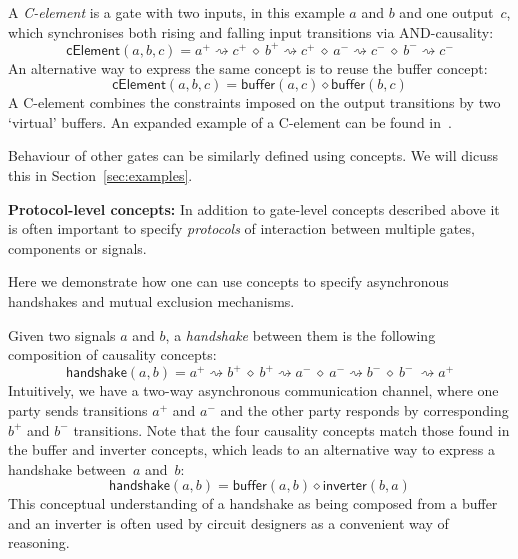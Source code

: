 \documentclass[british,conference,compsoc]{IEEEtran}
\begin{document}

\noindent A \emph{C-element} is a gate with two inputs, in this example $a$ and $b$ and one
output~$c$, which synchronises both rising and falling input transitions
via AND-causality:
\[
\mathsf{cElement}(a, b, c)=a^{+}\!\rightsquigarrow\! c^{+}\ \diamond\
b^{+}\!\rightsquigarrow\! c^{+}\ \diamond\ a^{-}\!\rightsquigarrow\! c^{-}\
\diamond\ b^{-}\!\rightsquigarrow\! c^{-}
\]
An alternative way to express the same concept is to reuse the buffer concept:
\[
\mathsf{cElement}(a, b, c)=\mathsf{buffer}(a, c) \diamond \mathsf{buffer}(b, c)
\]
A C-element combines the constraints imposed on the output
transitions by two `virtual' buffers. An expanded example of a C-element can be
found in~\cite{2015_Beaumont_MEMOCODE}.

Behaviour of other gates can be similarly defined using concepts. We will dicuss
this in Section~\ref{sec:examples}.

\textbf{Protocol-level concepts:} In addition to gate-level concepts
described above it is often important to specify \emph{protocols}
of interaction between multiple gates, components or signals. 

Here we demonstrate how one can use concepts to specify asynchronous handshakes
and mutual exclusion mechanisms.

Given two signals $a$ and $b$, a \emph{handshake} between them is
the following composition of causality concepts:
\[
\mathsf{handshake}(a, b)=a^{+}\!\rightsquigarrow\! b^{+}\ \diamond\
b^{+}\!\rightsquigarrow\! a^{-}\ \diamond\ a^{-}\!\rightsquigarrow\! b^{-}\
\diamond\ b^{-}\ \rightsquigarrow\! a^{+}
\]
Intuitively, we have a two-way asynchronous communication channel,
where one party sends transitions $a^{+}$ and $a^{-}$ and the other
party responds by corresponding $b^{+}$ and $b^{-}$ transitions.
Note that the four causality concepts match those found
in the buffer and inverter concepts, which leads to an alternative
way to express a handshake between~$a$ and~$b$:
\[
\mathsf{handshake}(a, b)=\mathsf{buffer}(a, b) \diamond\mathsf{inverter}(b, a)
\]
This conceptual understanding of a handshake as being composed
from a buffer and an inverter is often used by circuit designers as
a convenient way of reasoning.
\end{document}
